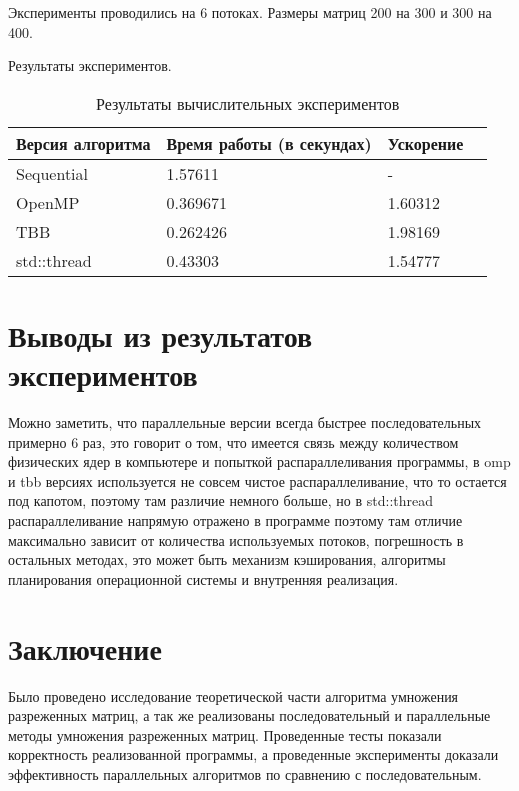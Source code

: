 \documentclass{report}
\begin{document}
\par Эксперименты проводились на 6 потоках. Размеры матриц 200 на 300 и 300 на 400.

\par Результаты экспериментов.
\begin{table}[!h]
\caption{Результаты вычислительных экспериментов}
\centering
\begin{tabular}{| p{2cm} | p{3cm} | p{4cm} | p{2cm} |}
\hline
Версия алгоритма & Время работы (в секундах) & Ускорение  \\[5pt]
\hline
Sequential        & 1.57611        & -           \\
OpenMP            & 0.369671       & 1.60312      \\
TBB               & 0.262426       & 1.98169       \\
std::thread       & 0.43303        & 1.54777        \\

\hline
\end{tabular}
\end{table}

\newpage

\section*{Выводы из результатов экспериментов}
Можно заметить, что параллельные версии всегда быстрее последовательных примерно 6 раз, это говорит о том, что имеется связь между количеством физических ядер в компьютере и попыткой распараллеливания программы, в omp и tbb версиях используется не совсем чистое распараллеливание, что то остается под капотом, поэтому там различие немного больше, но в std::thread распараллеливание напрямую отражено в программе поэтому там отличие максимально зависит от количества используемых потоков, погрешность в остальных методах, это может быть механизм кэширования, алгоритмы планирования операционной системы и внутренняя реализация.
\newpage

\section*{Заключение}
Было проведено исследование теоретической части алгоритма умножения разреженных матриц, а так же реализованы последовательный и параллельные методы умножения разреженных матриц. Проведенные тесты показали корректность реализованной программы, а проведенные эксперименты доказали эффективность параллельных алгоритмов по сравнению с последовательным.
\newpage
\end{document}
